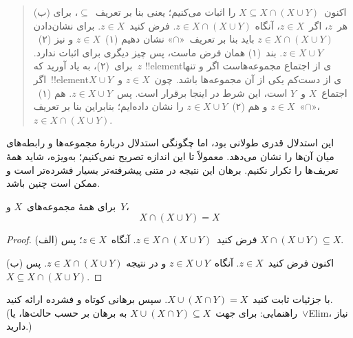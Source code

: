 \documentclass[../../../include/open-logic-section]{subfiles}
\begin{document}
\begin{explain}
\begin{quote}
(ب) اکنون~$X \subseteq X \cap (X \cup Y)$ را اثبات می‌کنیم؛ یعنی بنا
بر تعریف~$\subseteq$، برای هر~$z$، اگر~$z \in X$، آنگاه
$z \in X \cap (X \cup Y)$. فرض کنید~$z \in X$. برای نشان‌دادن
$z \in X \cap (X \cup Y)$ باید بنا بر تعریف~«$\cap$» نشان دهیم
(۱)~$z \in X$ و نیز (۲)~$z \in X \cup Y$. بند~(۱) همان فرض ماست، پس
چیز دیگری برای اثبات ندارد. برای~(۲)، به یاد آورید که~$z$ !!{element}ی
از اجتماع مجموعه‌هاست اگر و تنها اگر~!!{element}ی از دست‌کم یکی از آن
مجموعه‌ها باشد. چون~$z \in X$ و~$X \cup Y$ اجتماع~$X$ و~$Y$ است، این
شرط در اینجا برقرار است. پس~$z \in X \cup Y$. هم (۱)~$z \in X$ و هم
(۲)~$z \in X \cup Y$ را نشان داده‌ایم؛ بنابراین بنا بر تعریف~«$\cap$»،
$z \in X \cap (X \cup Y)$.
\end{quote}

این استدلال قدری طولانی بود، اما چگونگی استدلال دربارهٔ مجموعه‌ها و
رابطه‌های میان آن‌ها را نشان می‌دهد. معمولاً تا این اندازه تصریح نمی‌کنیم؛
به‌ویژه، شاید همهٔ تعریف‌ها را تکرار نکنیم. برهان این نتیجه در متنی
پیشرفته‌تر بسیار فشرده‌تر است و ممکن است چنین باشد.
\end{explain}


\begin{prop}[جذب]
برای همهٔ مجموعه‌های~$X$ و~$Y$،
\[
X \cap (X \cup Y) = X
\]
\end{prop}

\begin{proof}
(الف) فرض کنید~$z \in X \cap (X \cup Y)$. آنگاه~$z \in X$؛ پس
$X \cap (X \cup Y) \subseteq X$.

(ب) اکنون فرض کنید~$z \in X$. آنگاه~$z \in X \cup Y$ و در نتیجه
$z \in X \cap (X \cup Y)$. پس~$X \subseteq X \cap (X \cup Y)$.
\end{proof}

\begin{prob}
با جزئیات ثابت کنید~$X \cup (X \cap Y) = X$. سپس برهانی کوتاه و فشرده
ارائه کنید. (راهنمایی: برای جهت~$X \cup (X \cap Y) \subseteq X$ به
برهان بر حسب حالت‌ها، یا~$\lor$Elim، نیاز دارید.)
\end{prob}
\end{document}
